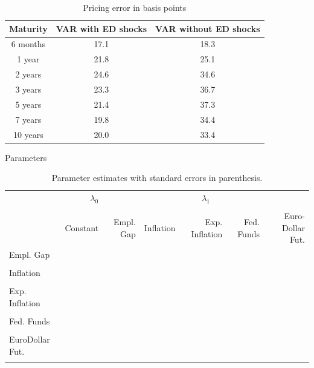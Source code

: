 \documentclass{article}
\numberwithin{equation}{section}
\begin{document}
\begin{table}
\begin{center}
\begin{tabular}{|c|c|c|}
    \hline
    \textbf{Maturity} & \textbf{VAR with ED shocks} & \textbf{VAR without ED
    shocks}\\ \hline
    6 months  & 17.1 & 18.3 \\ \hline
    1 year    & 21.8 & 25.1 \\ \hline
    2 years   & 24.6 & 34.6 \\ \hline
    3 years   & 23.3 & 36.7 \\ \hline
    5 years   & 21.4 & 37.3 \\ \hline
    7 years   & 19.8 & 34.4 \\ \hline
    10 years  & 20.0 & 33.4 \\ \hline
\end{tabular}
\end{center}
\label{tab:2}
\caption{Pricing error in basis points}
\end{table}

Parameters

\begin{table}
  \centering
  \begin{tabular}{lrrrrrr}
    \toprule
    & $\lambda_0$ &\multicolumn{5}{c}{$\lambda_1$} \\
    \cmidrule{2-2} \cmidrule(l){3-7} \\
    & Constant & Empl. Gap & Inflation & Exp. Inflation & Fed. Funds
    & Euro-Dollar Fut. \\
    Empl. Gap       & & & & & & \\
                    & & & & & & \\ %
    Inflation       & & & & & & \\
                    & & & & & & \\
    Exp. Inflation  & & & & & & \\
                    & & & & & & \\
    Fed. Funds      & & & & & & \\
                    & & & & & & \\
    EuroDollar Fut. & & & & & & \\
                    & & & & & & \\
    \bottomrule
  \end{tabular}
  \caption{Parameter estimates with standard errors in parenthesis.}
  \label{tab:3}
\end{table}
\end{document}
